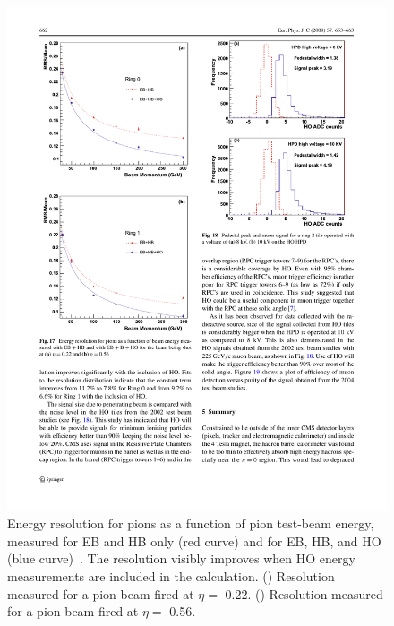 \begin{figure}[hbtp]
\begin{center}
    \includegraphics[width=1.2\cmsFigWidth]{figures/cms-hcal-performance2}
    \caption{Energy resolution for pions as a function of pion test-beam energy, measured for EB and HB only (red curve) and for EB, HB, and HO (blue curve)~\cite{Baiatian:951395}. The resolution visibly improves when HO energy measurements are included in the calculation. (\cmsLeft) Resolution measured for a pion beam fired at $\eta =$ 0.22. (\cmsRight) Resolution measured for a pion beam fired at $\eta =$ 0.56.}
    \label{fig:cms-hcal-performance}
  \end{center}
\end{figure}


